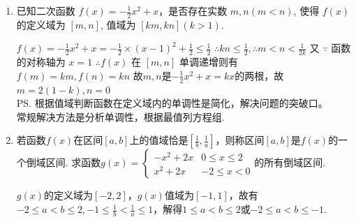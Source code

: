 \begin{enumerate}
\begin{enumerate}
\begin{jieda}
        $2b=f(1)+f(3)$, 于是$b=\frac{1}{8}$. \\
        \ps $f(x)$的对称中心是$(a, b)$或对称轴是$x = a$的必要条件均为$f(x)$的定义域关于$a$对称.
        \end{jieda}
        \item 已知二次函数 $f(x)=-\frac{1}{2} x^2+x$，是否存在实数 $m, n(m<n)$, 使得 $f(x)$ 的定义域为 $[m, n]$, 值域为 $[k m, k n](k>1)$.
        \begin{jieda}
        $f(x)=-\frac{1}{2} x^2+x=-\frac{1}{2} \times(x-1)^2+\frac{1}{2} \leq \frac{1}{2}$
        $\therefore k n \leq \frac{1}{2}, \therefore m<n<\frac{1}{2k}$
        又 $\because$ 函数的对称轴为 $x=1$
        $\therefore f(x)$ 在 $[m, n]$ 单调递增则有 $f(m)=k m, f(n)=k n$
        故$m, n$是$-\frac{1}{2}x^2 + x = kx$的两根，故$m = 2(1-k), n = 0$ \\
        \ps 根据值域判断函数在定义域内的单调性是简化，解决问题的突破口。\\
        常规解决方法是分析单调性，根据最值列方程组.
        \end{jieda}
        \item 若函数$f(x)$在区间$[a, b]$上的值域恰是$[\frac{1}{b}, \frac{1}{a}]$，则称区间$[a, b]$是$f(x)$的一个倒域区间. 求函数$g(x) = \left \{ \begin{array}{ll}
            -x^2+2x & 0 \leq x \leq 2 \\
            x^2 + 2x & -2 \leq x < 0
        \end{array}\right.$的所有倒域区间.
        \begin{jieda}
            $g(x)$的定义域为$[-2, 2]$，$g(x)$值域为$[-1, 1]$，故有$-2 \leq a < b \leq 2, -1 \leq \frac{1}{b} < \frac{1}{a} \leq 1$，解得$1 \leq a < b \leq 2$或$-2 \leq a < b \leq -1$.

\end{jieda}
\end{enumerate}
\end{enumerate}
